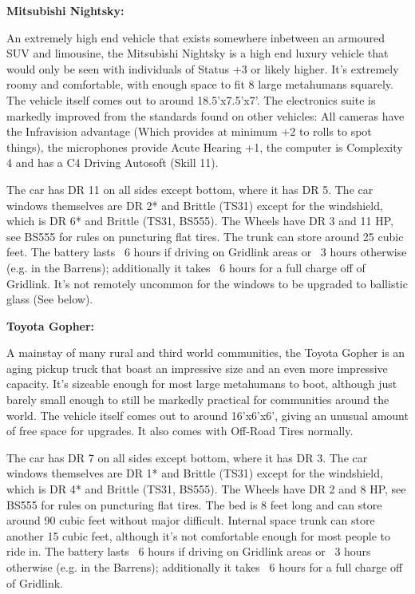 \textbf{Mitsubishi Nightsky:}

An extremely high end vehicle that exists somewhere inbetween an armoured SUV and limousine, the Mitsubishi Nightsky is a high end luxury vehicle that would only be seen with individuals of Status +3 or likely higher. It's extremely roomy and comfortable, with enough space to fit 8 large metahumans squarely. The vehicle itself comes out to around 18.5'x7.5'x7'. The electronics suite is markedly improved from the standards found on other vehicles: All cameras have the Infravision advantage (Which provides at minimum +2 to rolls to spot things), the microphones provide Acute Hearing +1, the computer is Complexity 4 and has a C4 Driving Autosoft (Skill 11).

The car has DR 11 on all sides except bottom, where it has DR 5. The car windows themselves are DR 2* and Brittle (TS31) except for the windshield, which is DR 6* and Brittle (TS31, BS555). The Wheels have DR 3 and 11 HP, see BS555 for rules on puncturing flat tires. The trunk can store around 25 cubic feet. The battery lasts ~6 hours if driving on Gridlink areas or ~3 hours otherwise (e.g. in the Barrens); additionally it takes ~6 hours for a full charge off of Gridlink. It's not remotely uncommon for the windows to be upgraded to ballistic glass (See below).

\textbf{Toyota Gopher:}

A mainstay of many rural and third world communities, the Toyota Gopher is an aging pickup truck that boast an impressive size and an even more impressive capacity. It's sizeable enough for most large metahumans to boot, although just barely small enough to still be markedly practical for communities around the world. The vehicle itself comes out to around 16'x6'x6', giving an unusual amount of free space for upgrades. It also comes with Off-Road Tires normally.


The car has DR 7 on all sides except bottom, where it has DR 3. The car windows themselves are DR 1* and Brittle (TS31) except for the windshield, which is DR 4* and Brittle (TS31, BS555). The Wheels have DR 2 and 8 HP, see BS555 for rules on puncturing flat tires. The bed is 8 feet long and can store around 90 cubic feet without major difficult. Internal space trunk can store another 15 cubic feet, although it's not comfortable enough for most people to ride in. The battery lasts ~6 hours if driving on Gridlink areas or ~3 hours otherwise (e.g. in the Barrens); additionally it takes ~6 hours for a full charge off of Gridlink.

